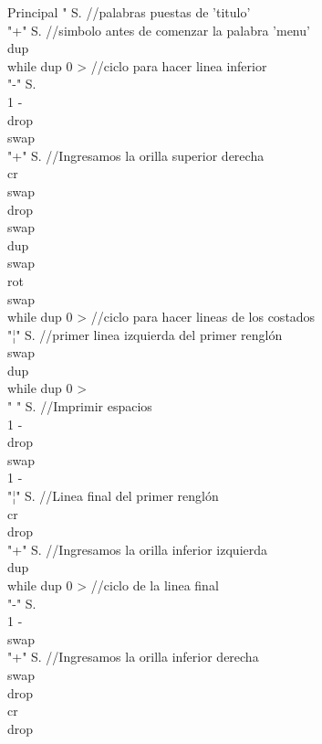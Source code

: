 \documentclass[conference]{IEEEtran}
\begin{document}
\begin{enumerate}
\begin{center}
Principal " S. //palabras puestas de 'titulo' \\ "+" S. //simbolo antes de comenzar la palabra 'menu' \\ dup \\ while dup 0 > //ciclo para hacer linea inferior \\  "-" S. \\  1 - \\ drop \\ swap \\ "+" S. //Ingresamos la orilla superior derecha \\ cr \\ swap \\ drop \\ swap \\ dup \\ swap \\ rot \\ swap \\ while dup 0 > //ciclo para hacer lineas de los costados \\ "¦" S. //primer linea izquierda del primer renglón \\   swap \\   dup \\   while dup 0 > \\ " " S. //Imprimir espacios \\   1 - \\   drop \\   swap \\   1 - \\   "¦" S. //Linea final del primer renglón \\   cr \\ drop \\ "+" S. //Ingresamos la orilla inferior izquierda \\ dup \\ while dup 0 > //ciclo de la linea final \\  "-" S.  \\  1 - \\ swap \\ "+" S. //Ingresamos la  orilla inferior derecha \\ swap \\ drop \\ cr \\ drop
	\end{center}
	

\end{enumerate}
\end{document}
